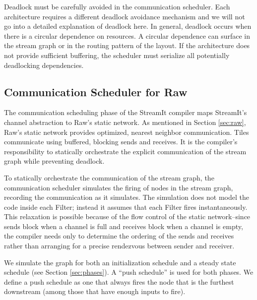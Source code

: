 Deadlock must be carefully avoided in the communication
scheduler. Each architecture requires a different deadlock avoidance
mechanism and we will not go into a detailed explanation of deadlock
here.  In general, deadlock occurs when there is a circular dependence
on resources.  A circular dependence can surface in the stream graph
or in the routing pattern of the layout.  If the architecture does not
provide sufficient buffering, the scheduler must serialize all
potentially deadlocking dependencies.


\subsection{Communication Scheduler for Raw}
\label{sec:rawcommunic}

The communication scheduling phase of the StreamIt compiler maps
StreamIt's channel abstraction to Raw's static network.  As mentioned
in Section \ref{sec:raw}, Raw's static network provides optimized,
nearest neighbor communication.  Tiles communicate using buffered,
blocking sends and receives.  It is the compiler's responsibility to
statically orchestrate the explicit communication of the stream graph
while preventing deadlock.

To statically orchestrate the communication of the stream graph, the
communication scheduler simulates the firing of nodes in the stream
graph, recording the communication as it simulates.  The simulation
does not model the code inside each Filter; instead it assumes that
each Filter fires instantaneously.  This relaxation is possible
because of the flow control of the static network--since sends block
when a channel is full and receives block when a channel is empty, the
compiler needs only to determine the ordering of the sends and
receives rather than arranging for a precise rendezvous between sender
and receiver.

We simulate the graph for both an initialization schedule and a steady
state schedule (see Section \ref{sec:phases}).  A ``push schedule'' is
used for both phases.  We define a push schedule as one that always
fires the node that is the furthest downstream (among those that have
enough inputs to fire).  
% 

